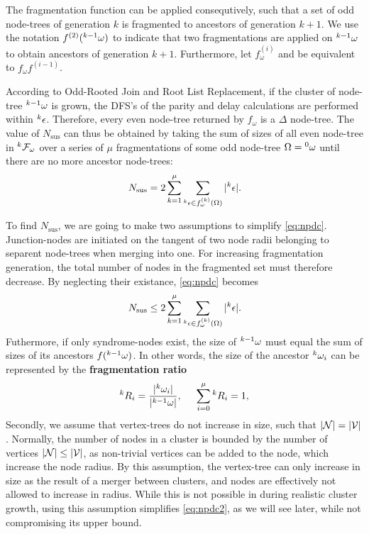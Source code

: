 The fragmentation function can be applied consequtively, such that a set of odd node-trees of generation $k$ is fragmented to ancestors of generation $k+1$. We use the notation $f^{(2)}({}^{k-1}\omega)$ to indicate that two fragmentations are applied on ${}^{k-1}\omega$ to obtain ancestors of generation $k+1$. Furthermore, let $f_\omega^{(i)}$ and be equivalent to $f_\omega f^{(i-1)}$. 

According to Odd-Rooted Join and Root List Replacement, if the cluster of node-tree ${}^{k-1}\omega$ is grown, the DFS's of the parity and delay calculations are performed within ${}^{k}\epsilon$. Therefore, every even node-tree returned by $f_\omega$ is a $\Delta$ node-tree. The value of $N_{\text{sus}}$ can thus be obtained by taking the sum of sizes of all even node-tree in ${}^{k}\mathcal{F}_\omega$ over a series of $\mu$ fragmentations of some odd node-tree $\Omega = {}^{0}\omega$ until there are no more ancestor node-trees:
\begin{equation}\label{eq:npdc}
  N_{\text{sus}} = 2\sum_{k=1}^\mu{ \sum_{ \pre{k}\epsilon \in f_\omega^{(k)}(\Omega) }{ \abs{\pre{k}\epsilon}} }.
\end{equation}

To find $N_{\text{sus}}$, we are going to make two assumptions to simplify \eqref{eq:npdc}. Junction-nodes are initiated on the tangent of two node radii belonging to separent node-trees when merging into one. For increasing fragmentation generation, the total number of nodes in the fragmented set must therefore decrease. By neglecting their existance, \eqref{eq:npdc} becomes
\begin{equation}\label{eq:npdc2}
  N_{\text{sus}} \leq 2\sum_{k=1}^\mu{ \sum_{ \pre{k}\epsilon \in f_\omega^{(k)}(\Omega) }{ \abs{\pre{k}\epsilon}} }.
\end{equation}
Futhermore, if only syndrome-nodes exist, the size of ${}^{k-1}\omega$ must equal the sum of sizes of its ancestors $f({}^{k-1}\omega)$. In other words, the size of the ancestor ${}^{k}\omega_i$ can be represented by the \textbf{fragmentation ratio}
\begin{equation}\label{eq:ratio}
  \pre{k}R_i = \frac{\abs{\pre{k}\omega_i}}{\abs{\pre{k-1}\omega}}, \hspace{0.5cm} \sum_{i=0}^{\mu}{\pre{k}R_i} = 1,
\end{equation}
Secondly, we assume that vertex-trees do not increase in size, such that $\lvert\mathcal{N}\rvert=\lvert\mathcal{V}\rvert$. Normally, the number of nodes in a cluster is bounded by the number of vertices $\lvert\mathcal{N}\rvert\leq \lvert\mathcal{V}\rvert$, as non-trivial vertices can be added to the node, which increase the node radius. By this assumption, the vertex-tree can only increase in size as the result of a merger between clusters, and nodes are effectively not allowed to increase in radius. While this is not possible in during realistic cluster growth, using this assumption simplifies \eqref{eq:npdc2}, as we will see later, while not compromising its upper bound. 

